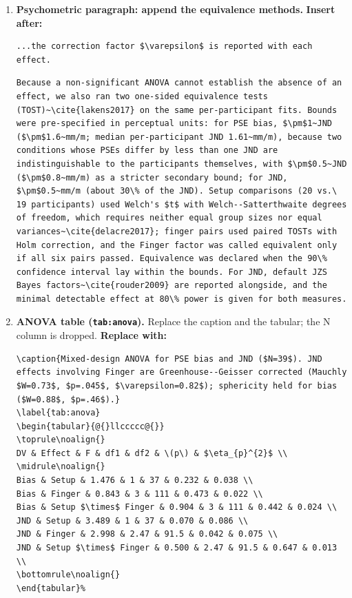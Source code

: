 \documentclass[11pt,a4paper]{article}
\newcommand{\replace}{\noindent\textbf{Replace with:}\par\nopagebreak}
\begin{document}
\begin{enumerate}[resume]
\item \textbf{Psychometric paragraph: append the equivalence methods.}
\noindent\textbf{Insert after:}\begin{lstlisting}
...the correction factor $\varepsilon$ is reported with each effect.
\end{lstlisting}
\begin{lstlisting}
Because a non-significant ANOVA cannot establish the absence of an effect, we also ran two one-sided equivalence tests (TOST)~\cite{lakens2017} on the same per-participant fits. Bounds were pre-specified in perceptual units: for PSE bias, $\pm$1~JND ($\pm$1.6~mm/m; median per-participant JND 1.61~mm/m), because two conditions whose PSEs differ by less than one JND are indistinguishable to the participants themselves, with $\pm$0.5~JND ($\pm$0.8~mm/m) as a stricter secondary bound; for JND, $\pm$0.5~mm/m (about 30\% of the JND). Setup comparisons (20 vs.\ 19 participants) used Welch's $t$ with Welch--Satterthwaite degrees of freedom, which requires neither equal group sizes nor equal variances~\cite{delacre2017}; finger pairs used paired TOSTs with Holm correction, and the Finger factor was called equivalent only if all six pairs passed. Equivalence was declared when the 90\% confidence interval lay within the bounds. For JND, default JZS Bayes factors~\cite{rouder2009} are reported alongside, and the minimal detectable effect at 80\% power is given for both measures.
\end{lstlisting}

\item \textbf{ANOVA table (\texttt{tab:anova}).} Replace the caption and the tabular; the N column is dropped.
\replace
\begin{lstlisting}
\caption{Mixed-design ANOVA for PSE bias and JND ($N=39$). JND effects involving Finger are Greenhouse--Geisser corrected (Mauchly $W=0.73$, $p=.045$, $\varepsilon=0.82$); sphericity held for bias ($W=0.88$, $p=.46$).}
\label{tab:anova}
\begin{tabular}{@{}llccccc@{}}
\toprule\noalign{}
DV & Effect & F & df1 & df2 & \(p\) & $\eta_{p}^{2}$ \\
\midrule\noalign{}
Bias & Setup & 1.476 & 1 & 37 & 0.232 & 0.038 \\
Bias & Finger & 0.843 & 3 & 111 & 0.473 & 0.022 \\
Bias & Setup $\times$ Finger & 0.904 & 3 & 111 & 0.442 & 0.024 \\
JND & Setup & 3.489 & 1 & 37 & 0.070 & 0.086 \\
JND & Finger & 2.998 & 2.47 & 91.5 & 0.042 & 0.075 \\
JND & Setup $\times$ Finger & 0.500 & 2.47 & 91.5 & 0.647 & 0.013 \\
\bottomrule\noalign{}
\end{tabular}%
\end{lstlisting}


\end{enumerate}
\end{document}
